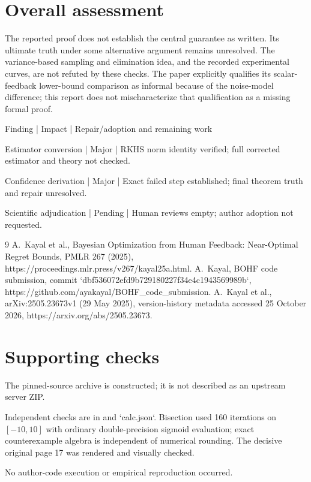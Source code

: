 \documentclass[10pt]{article}
\begin{document}
\section*{Overall assessment}
The reported proof does not establish the central guarantee as written. Its ultimate truth under some alternative argument remains unresolved. The variance-based sampling and elimination idea, and the recorded experimental curves, are not refuted by these checks. The paper explicitly qualifies its scalar-feedback lower-bound comparison as informal because of the noise-model difference; this report does not mischaracterize that qualification as a missing formal proof.\par
Finding | Impact | Repair/adoption and remaining work\par
Estimator conversion | Major | RKHS norm identity verified; full corrected estimator and theory not checked.\par
Confidence derivation | Major | Exact failed step established; final theorem truth and repair unresolved.\par
Scientific adjudication | Pending | Human reviews empty; author adoption not requested.\par
9 A. Kayal et al., Bayesian Optimization from Human Feedback: Near-Optimal Regret Bounds, PMLR 267 (2025), https://proceedings.mlr.press/v267/kayal25a.html. A. Kayal, BOHF code submission, commit `dbf536072efd9b729180227f34e4c1943569989b`, https://github.com/ayakayal/BOHF\_code\_submission. A. Kayal et al., arXiv:2505.23673v1 (29 May 2025), version-history metadata accessed 25 October 2026, https://arxiv.org/abs/2505.23673.\par
\section*{Supporting checks}
The pinned-source archive is constructed; it is not described as an upstream server ZIP.\par
Independent checks are in and `calc.json`. Bisection used 160 iterations on \([-10,10]\) with ordinary double-precision sigmoid evaluation; exact counterexample algebra is independent of numerical rounding. The decisive original page 17 was rendered and visually checked.\par
No author-code execution or empirical reproduction occurred.\par
\end{document}
